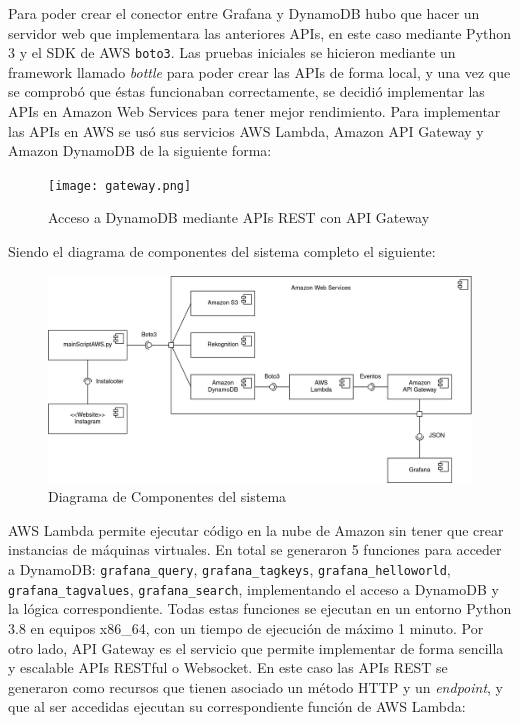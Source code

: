 Para poder crear el conector entre Grafana y DynamoDB hubo que hacer un servidor web que implementara las anteriores APIs, en este caso mediante Python 3 y el SDK de AWS \texttt{boto3}. Las pruebas iniciales se hicieron mediante un framework llamado \textit{bottle} para poder crear las APIs de forma local, y una vez que se comprobó que éstas funcionaban correctamente, se decidió implementar las APIs en Amazon Web Services para tener mejor rendimiento. Para implementar las APIs en AWS se usó sus servicios AWS Lambda, Amazon API Gateway y Amazon DynamoDB de la siguiente forma:

\begin{figure}[H]
    \centering
    \texttt{[image: gateway.png]}
    \caption{Acceso a DynamoDB mediante APIs REST con API Gateway}
    \label{fig:gateway_schema}
\end{figure}

Siendo el diagrama de componentes del sistema completo el siguiente:

\begin{figure}[H]
    \hspace*{-1cm}
    \centering
    \includegraphics[width=1.2\textwidth]{memoria/img/component.drawio.png}
    \caption{Diagrama de Componentes del sistema}
    \label{fig:component_diag}
\end{figure}

AWS Lambda permite ejecutar código en la nube de Amazon sin tener que crear instancias de máquinas virtuales. En total se generaron 5 funciones para acceder a DynamoDB: \texttt{grafana\_query}, \texttt{grafana\_tagkeys}, \texttt{grafana\_helloworld}, \texttt{grafana\_tagvalues}, \texttt{grafana\_search}, implementando el acceso a DynamoDB y la lógica correspondiente. Todas estas funciones se ejecutan en un entorno Python 3.8 en equipos x86\_64, con un tiempo de ejecución de máximo 1 minuto. Por otro lado, API Gateway es el servicio que permite implementar de forma sencilla y escalable APIs RESTful o Websocket. En este caso las APIs REST se generaron como recursos que tienen asociado un método HTTP y un \textit{endpoint}, y que al ser accedidas ejecutan su correspondiente función de AWS Lambda:

